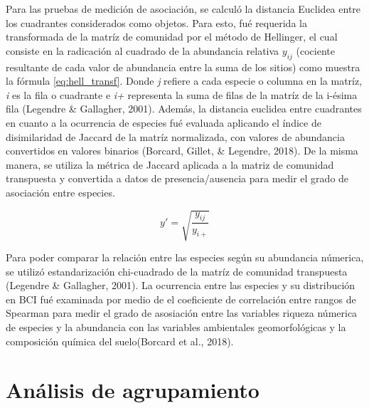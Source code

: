 \documentclass[11pt,]{article}
\begin{document}
Para las pruebas de medición de asociación, se calculó la distancia
Euclidea entre los cuadrantes considerados como objetos. Para esto, fué
requerida la transformada de la matríz de comunidad por el método de
Hellinger, el cual consiste en la radicación al cuadrado de la
abundancia relativa \(y_{ij}\) (cociente resultante de cada valor de
abundancia entre la suma de los sitios) como muestra la fórmula
\ref{eq:hell_transf}. Donde \emph{j} refiere a cada especie o columna en
la matríz, \emph{i} es la fila o cuadrante e \emph{i+} representa la
suma de filas de la matríz de la i-ésima fila (Legendre \& Gallagher,
2001). Además, la distancia euclidea entre cuadrantes en cuanto a la
ocurrencia de especies fué evaluada aplicando el índice de disimilaridad
de Jaccard de la matríz normalizada, con valores de abundancia
convertidos en valores binarios (Borcard, Gillet, \& Legendre, 2018). De
la misma manera, se utiliza la métrica de Jaccard aplicada a la matriz
de comunidad transpuesta y convertida a datos de presencia/ausencia para
medir el grado de asociación entre especies.

\begin{equation} \label{eq:hell_transf}
y' = \sqrt{\frac{y_{ij}}{y_{i+}}}
\end{equation}

Para poder comparar la relación entre las especies según su abundancia
númerica, se utilizó estandarización chi-cuadrado de la matríz de
comunidad transpuesta (Legendre \& Gallagher, 2001). La ocurrencia entre
las especies y su distribución en BCI fué examinada por medio de el
coeficiente de correlación entre rangos de Spearman para medir el grado
de asosiación entre las variables riqueza númerica de especies y la
abundancia con las variables ambientales geomorfológicas y la
composición química del suelo(Borcard et al., 2018).

\section{Análisis de agrupamiento}\label{anuxe1lisis-de-agrupamiento}
\end{document}
